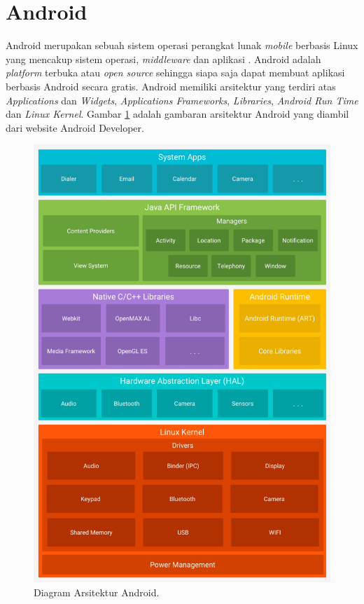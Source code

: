 \section{Android}
Android merupakan sebuah sistem operasi perangkat lunak \textit{mobile} berbasis Linux yang mencakup sistem operasi, \textit{middleware} dan aplikasi \citep{supardi2011}. Android adalah \textit{platform} terbuka atau \textit{open source} sehingga siapa saja dapat membuat aplikasi berbasis Android secara gratis. Android memiliki arsitektur yang terdiri atas \textit{Applications} dan \textit{Widgets}, \textit{Applications Frameworks}, \textit{Libraries}, \textit{Android Run Time} dan \textit{Linux Kernel}. Gambar \ref{android} adalah gambaran arsitektur Android yang diambil dari website Android Developer.
  \begin{figure}[H]
	\centering
	\includegraphics[scale=0.85]{gambar/android}
	\caption{Diagram Arsitektur Android.}
	\label{android}
  \end{figure}

